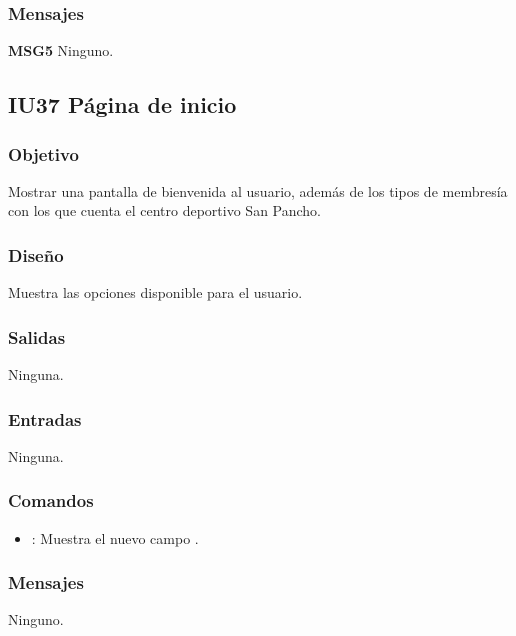 \subsubsection{Mensajes}
	\begin{Citemize}
		\item {\bf MSG5} Ninguno.
	\end{Citemize}


\subsection{IU37 Página de inicio}

\subsubsection{Objetivo}
	Mostrar una pantalla de bienvenida al usuario, además de los tipos de membresía con los que cuenta el centro deportivo San Pancho.

\subsubsection{Diseño}
	Muestra las opciones disponible para el usuario.


\subsubsection{Salidas}

	Ninguna.

\subsubsection{Entradas}
	Ninguna.

\subsubsection{Comandos}
\begin{itemize}
	\item {}: Muestra el nuevo campo .
\end{itemize}

\subsubsection{Mensajes}
	\begin{Citemize}
		\item Ninguno.
	\end{Citemize}
	
